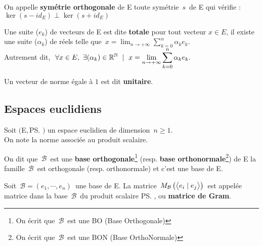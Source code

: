 \vspace{0.5cm}

\noindent On appelle \textbf{symétrie orthogonale} de E toute symétrie $\,s\,$ de E qui vérifie : \(\ker (s-id_E)\perp \ker (s+id_E)\)

\vspace{1cm}

Une suite (\(e_k\)) de vecteurs de E est dite \textbf{totale} \ssi pour tout vecteur \(x\in E\), il existe une suite (\(\alpha_k\)) de réels telle que \(\,\displaystyle x =\!\lim_{n\to +\infty} \sum_{k=0}^{n}\alpha_ke_k. \)\\
Autrement dit, \ssi \(\displaystyle\ \forall x\in E,\ \exists(\alpha_k)\in \mathbb{R}^{\mathbb{N}} \ \mid \ x=\lim_{n\to +\infty} \sum_{k=0}^{n}\alpha_ke_k. \)

\vspace{1cm}

Un vecteur de norme égale à $1$ est dit \textbf{unitaire}.

\vspace{1.5cm}

\subsection{Espaces euclidiens}

\vspace{0.5cm}

\begin{center}
    Soit $\bigl($E,\,\ps$\bigr)$ un espace euclidien de dimension \(\,n\geq 1\).\vspace{0.1cm}\\
    On note \normtxt{\ } la norme associée au produit scalaire.
\end{center}

\vspace{0.7cm}

\noindent On dit que $\,\mathcal{B}\,$ est une \textbf{base orthogonale}\footnote{On écrit que \(\,\mathcal{B}\,\) est une BO (Base Orthogonale)} (resp. \textbf{base orthonormale}\footnote{On écrit que \(\,\mathcal{B}\,\) est une BON (Base OrthoNormale)}) de E \ssi la famille \(\,\mathcal{B}\,\) est orthogonale (resp. orthonormale) et c'est une base de E.

\vspace{1.3cm}

\noindent Soit \(\,\mathcal{B}=(e_1,\cdots,e_n)\,\) une base de E. La matrice \(\,M_\mathcal{B}\left(\bigl\langle e_i\mid e_j \bigr\rangle\right)\,\) est appelée matrice dans la base \(\,\mathcal{B}\,\) du produit scalaire \ps, ou \textbf{matrice de Gram}.

